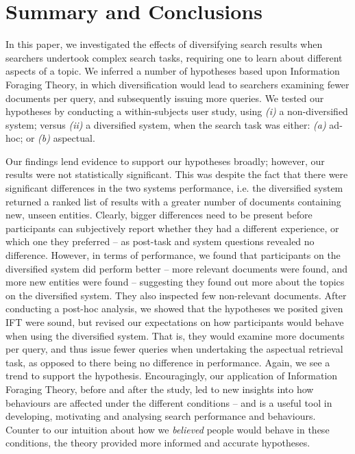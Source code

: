 \section{Summary and Conclusions} \label{sec:conclusion}

In this paper, we investigated the effects of diversifying search results when searchers undertook complex search tasks, requiring one to learn about different aspects of a topic. We inferred a number of hypotheses based upon Information Foraging Theory, in which diversification would lead to searchers examining fewer documents per query, and subsequently issuing more queries. We tested our hypotheses by conducting a within-subjects user study, using \emph{(i)} a non-diversified system; versus \emph{(ii)} a diversified system, when the search task was either: \emph{(a)} ad-hoc; or \emph{(b)} aspectual.

Our findings lend evidence to support our hypotheses broadly; however, our results were not statistically significant. This was despite the fact that there were significant differences in the two systems performance, i.e. the diversified system returned a ranked list of results with a greater number of documents containing new, unseen entities. Clearly, bigger differences need to be present before participants can subjectively report whether they had a different experience, or which one they preferred -- as post-task and system questions revealed no difference. However, in terms of performance, we found that participants on the diversified system did perform better -- more relevant documents were found, and more new entities were found -- suggesting they found out more about the topics on the diversified system. They also inspected few non-relevant documents. After conducting a post-hoc analysis, we showed that the hypotheses we posited given IFT were sound, but revised our expectations on how participants would behave when using the diversified system. That is, they would examine more documents per query, and thus issue fewer queries when undertaking the aspectual retrieval task, as opposed to there being no difference in performance. Again, we see a trend to support the hypothesis. Encouragingly, our application of Information Foraging Theory, before and after the study, led to new insights into how behaviours are affected under the different conditions -- and is a useful tool in developing, motivating and analysing search performance and behaviours. Counter to our intuition about how we \emph{believed} people would behave in these conditions, the theory provided more informed and accurate hypotheses.

